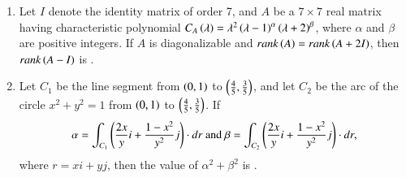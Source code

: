 \documentclass[journal]{IEEEtran}
\begin{document}
\begin{enumerate}[start=4]
\begin{enumerate}
\end{enumerate}
\item Let $I$ denote the identity matrix of order 7, and $A$ be a $7 \times 7$ real matrix having characteristic polynomial $C_A\left(\lambda\right) = \lambda^2\left(\lambda - 1\right)^\alpha\left(\lambda + 2\right)^\beta$, where $\alpha$ and $\beta$ are positive integers. If $A$ is diagonalizable and $rank\left(A\right) = rank\left(A + 2I\right)$, then $rank\left(A - I\right)$ is \underline{\hspace{1cm}}.
\item Let $C_1$ be the line segment from $\left(0,1\right)$ to $\left(\frac{4}{5}, \frac{3}{5}\right)$, and let $C_2$ be the arc of the circle $x^2 + y^2 = 1$ from $\left(0,1\right)$ to $\left(\frac{4}{5}, \frac{3}{5}\right)$. If
$$\alpha = \int_{C_1} \left(\frac{2x}{y}i + \frac{1-x^2}{y^2}j\right) \cdot dr \text{ and } \beta = \int_{C_2} \left(\frac{2x}{y}i + \frac{1-x^2}{y^2}j\right) \cdot dr,$$
where $r = xi + yj$, then the value of $\alpha^2 + \beta^2$ is \underline{\hspace{1cm}}.
\end{enumerate}
\end{document}
